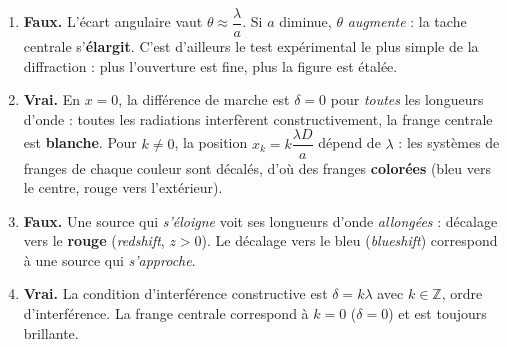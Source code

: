 \documentclass[11pt]{article}
\begin{document}
\begin{corrige}
\begin{enumerate}
    \item \textbf{Faux.} L'écart angulaire vaut $\theta \approx \dfrac{\lambda}{a}$. Si $a$ diminue, $\theta$ \emph{augmente} : la tache centrale s'\textbf{élargit}. C'est d'ailleurs le test expérimental le plus simple de la diffraction : plus l'ouverture est fine, plus la figure est étalée.
    \item \textbf{Vrai.} En $x = 0$, la différence de marche est $\delta = 0$ pour \emph{toutes} les longueurs d'onde : toutes les radiations interfèrent constructivement, la frange centrale est \textbf{blanche}. Pour $k \neq 0$, la position $x_k = k\dfrac{\lambda D}{a}$ dépend de $\lambda$ : les systèmes de franges de chaque couleur sont décalés, d'où des franges \textbf{colorées} (bleu vers le centre, rouge vers l'extérieur).
    \item \textbf{Faux.} Une source qui \emph{s'éloigne} voit ses longueurs d'onde \emph{allongées} : décalage vers le \textbf{rouge} (\emph{redshift}, $z > 0$). Le décalage vers le bleu (\emph{blueshift}) correspond à une source qui \emph{s'approche}.
    \item \textbf{Vrai.} La condition d'interférence constructive est $\delta = k\lambda$ avec $k \in \mathbb{Z}$, ordre d'interférence. La frange centrale correspond à $k = 0$ ($\delta = 0$) et est toujours brillante.
\end{enumerate}
\end{corrige}
\end{document}
